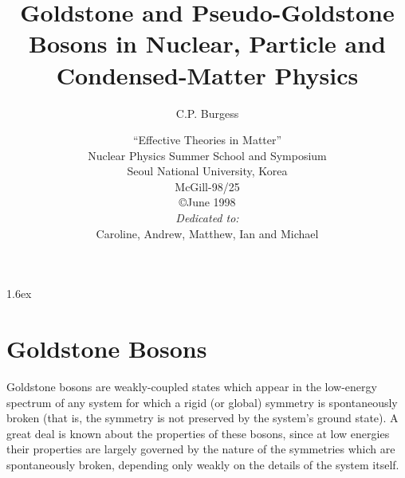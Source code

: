 
\makeatletter
{}
\makeatother

\oddsidemargin 0.2cm
\topmargin -1.5cm \headheight 12pt \headsep 25pt   
\footheight 12pt \footskip
75pt
\textheight 21.5cm \textwidth 16cm
\parindent 1.0cm  \baselineskip 1.6ex


\def\nq{n_\ssq}
\def\ns{n_\ssS}
\def\Wh{W}
\def\oneloop{{1\ell}}
\def\lowe{{\rm l.e.}}
\def\hie{{\rm h.e.}}
\def\leff{\Scl^{\rm eff}}
\def\seff{S^{\rm eff}}
\def\swrong{S^{\rm wrong}}
\def\lwrong{\Scl^{\rm wrong}}
\def\sw{S^\ssw}
\def\lw{\Scl^\ssw}
\def\Tc{$T_c$}
\def\GB{{\sss GB}}
\def\pGB{{\sss pGB}}
\def\SC{{\sss SC}}
\def\AF{{\sss AF}}
\def\inv{{\rm inv}}
\def\sb{{\rm sb}}
\def\opt{{\rm opt}}


%
%
\title{Goldstone and Pseudo-Goldstone Bosons in Nuclear,
Particle and Condensed-Matter Physics }
\author{C.P. Burgess}
\date{``Effective Theories in Matter''\\
Nuclear Physics Summer School and Symposium\\
Seoul National University, Korea \\
McGill-98/25\\
$ $ \\
\copyright June 1998\\ 
$ $  \\
$ $  \\
$ $  \\
{\sl Dedicated to:} \\
Caroline, Andrew, Matthew, Ian and Michael}
\maketitle
{}
\tableofcontents
\listoffigures
\listoftables
\setlength{\baselineskip}{5ex}





\chapter{Goldstone Bosons}

Goldstone bosons are  weakly-coupled states which appear in
the low-energy spectrum of any system for which a rigid (or
global) symmetry is spontaneously broken (that is, the
symmetry is not preserved by the system's ground state).  A
great deal is known about the properties of these bosons,
since at low energies their properties are largely governed
by the nature of the symmetries which are spontaneously
broken, depending only weakly on the details of the system
itself.

